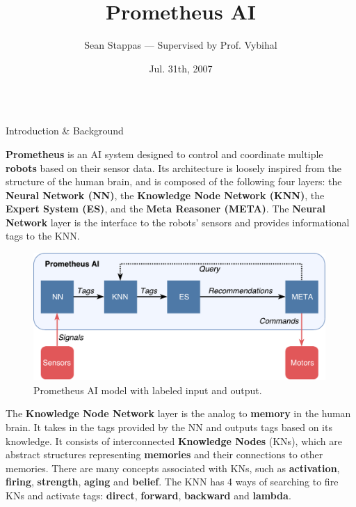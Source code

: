 \documentclass[final]{beamer} %
\title[Fancy Posters]{Prometheus AI}
\author{Sean Stappas --- Supervised by Prof. Vybihal}
\institute[RWTH Aachen University]{}
\date{Jul. 31th, 2007}
\newlength{\columnheight}
\begin{document}
	\begin{frame}
		\begin{columns}
			\begin{column}{.33\textwidth}
				\parbox[t][\columnheight]{\textwidth}{
				\begin{block}{Introduction \& Background}
					\parbox{0.99\textwidth}{
						\textbf{Prometheus} is an AI system designed to control and coordinate multiple \textbf{robots} based on their sensor data. Its architecture is loosely inspired from the structure of the human brain, and is composed of the following four layers: the \textbf{Neural Network (NN)}, the \textbf{Knowledge Node Network (KNN)}, the \textbf{Expert System (ES)}, and the \textbf{Meta Reasoner (META)}. The \textbf{Neural Network} layer is the interface to the robots' sensors and provides informational tags to the KNN.}
				
					\begin{figure}[!htb]
						\includegraphics[width=0.99\textwidth]{figures/ai_model_labeled.pdf}
						\caption{Prometheus AI model with labeled input and output.}
						\label{model_labeled}
					\end{figure}
				
					\parbox{0.99\textwidth}{The \textbf{Knowledge Node Network} layer is the analog to \textbf{memory} in the human brain. It takes in the tags provided by the NN and outputs tags based on its knowledge. It consists of interconnected \textbf{Knowledge Nodes} (KNs), which are abstract structures representing \textbf{memories} and their connections to other memories. There are many concepts associated with KNs, such as \textbf{activation}, \textbf{firing}, \textbf{strength}, \textbf{aging} and \textbf{belief}. The KNN has 4 ways of searching to fire KNs and activate tags: \textbf{direct}, \textbf{forward}, \textbf{backward} and \textbf{lambda}.}
					

\end{block}}
\end{column}
\end{columns}
\end{frame}
\end{document}
